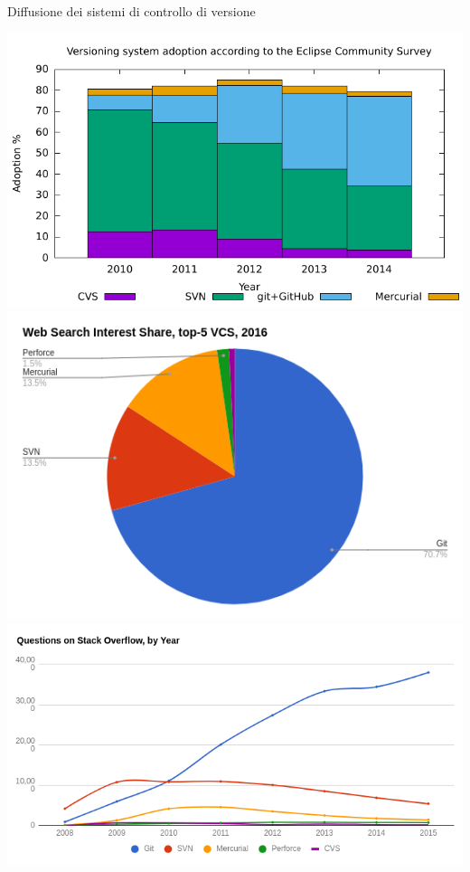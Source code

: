 \documentclass[presentation]{beamer}
\begin{document}
\begin{frame}[allowframebreaks]{Diffusione dei sistemi di controllo di versione}
    \begin{center}
        \includegraphics[width=\textwidth, height=.77\textheight, keepaspectratio]{img/chart} \\
        \includegraphics[width=\textwidth, height=.77\textheight, keepaspectratio]{img/interest} \\
        \includegraphics[width=\textwidth, height=.77\textheight, keepaspectratio]{img/questions} 

\end{center}
\end{frame}
\end{document}

